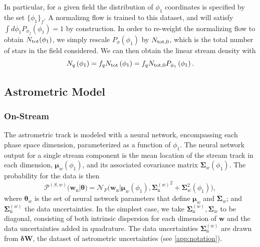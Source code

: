 \documentclass[twocolumn]{aastex631}
\newcommand{\mrm}[1]{\mathrm{#1}}
\newcommand{\mbs}[1]{\boldsymbol{#1}}
\newcommand{\mbf}[1]{\mathbf{#1}}
\newcommand{\mcal}[1]{\mathcal{#1}}
\newcommand{\pdf}{\mcal{P}}
\newcommand{\nth}[1]{{#1}_{\mrm{n}}}  %
\newcommand{\smallcomponent}[2]{#2^{\scriptscriptstyle (#1)}}
\newcommand{\cmp}[2]{\smallcomponent{#1}{#2}}
\newcommand{\astroM}[1]{{#1}_w}
\begin{document}
        In particular, for a given field the distribution of $\phi_1$
        coordinates is specified by the set $\{\phi_1\}_f$. A normalizng flow is
        trained to this dataset, and will satisfy $\int d\phi_1
        P_{\phi_f}(\phi_1) = 1$ by construction. In order to re-weight the
        normalizing flow to obtain $N_{\rm tot}(\phi_1)$, we simply rescale
        $P_{\phi}(\phi_1)$ by $N_{\rm tot,0}$, which is the total number of
        stars in the field considered. We can then obtain the linear stream
        density with
        \begin{equation}
            N_q\left(\phi_1\right) = f_q N_{\rm tot} \left(\phi_1\right)  = f_q N_{\rm tot,0} P_{\phi_1}\left(\phi_1\right) .
        \end{equation}

    
        
    \subsection{Astrometric Model} \label{sub:method:astrometric_model}

        \subsubsection{On-Stream} \label{ssub:method:astrometric_model:on_stream}
    
            The astrometric track is modeled with a neural network, encompassing
            each phase space dimension, parameterized as a function of $\phi_1$.
            The neural network output for a single stream component is the mean
            location of the stream track in each dimension,
            $\astroM{\mbs{\mu}}(\phi_1)$, and its associated covariance matrix
            $\astroM{\mbs{\Sigma}}(\phi_1)$. The probability for the data is
            then
            \begin{equation}
                \cmp{S,w}{\pdf}(\nth{\mbs{w}} | \mbs{\theta}) \! = \mcal{N}_F \big(\nth{\mbs{w}} | \astroM{\mbs{\mu}}\!(\phi_1), {\cmp{w}{\nth{\mbs{\Sigma}}}}^2 \! + \!  \astroM{\mbs{\Sigma}}^2\!\left(\phi_1\right) \!\big),
            \end{equation}
            where $\astroM{\mbs{\theta}}$ is the set of neural network
            parameters that define $\astroM{\mbs{\mu}}$ and
            $\astroM{\mbs{\Sigma}}$; and $\cmp{w}{\nth{\mbs{\Sigma}}}$ the data
            uncertainties.  In the simplest case, we take
            $\cmp{w}{\nth{\mbs{\Sigma}}}, \astroM{\mbs{\Sigma}}$ to be diagonal,
            consisting of both intrinsic dispersion for each dimension of
            $\mbs{w}$ and the data uncertainties added in quadrature. The data
            uncertainties $\cmp{w}{\nth{\mbs{\Sigma}}}$ are drawn from
            $\mbs{\delta}\mbf{W}$, the dataset of astrometric uncertainties (see
            \autoref{app:notation}).
\end{document}
